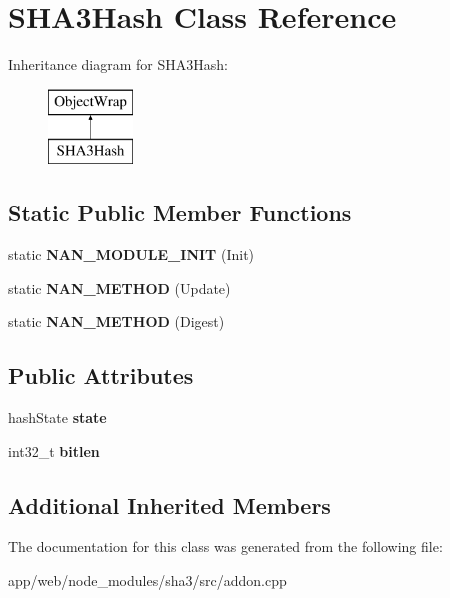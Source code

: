 \hypertarget{class_s_h_a3_hash}{}\section{S\+H\+A3\+Hash Class Reference}
\label{class_s_h_a3_hash}
Inheritance diagram for S\+H\+A3\+Hash\+:\begin{figure}[H]
\begin{center}
\leavevmode
\includegraphics[height=2.000000cm]{class_s_h_a3_hash}
\end{center}
\end{figure}
\subsection*{Static Public Member Functions}
\begin{DoxyCompactItemize}
\item 
\mbox{\label{class_s_h_a3_hash_ae3abb7e4bbf5833b3c4eb1c877d1453a}} 
static {\bfseries N\+A\+N\+\_\+\+M\+O\+D\+U\+L\+E\+\_\+\+I\+N\+IT} (Init)
\item 
\mbox{\label{class_s_h_a3_hash_a2b3dce39985e4d038b82e880e8cdc25a}} 
static {\bfseries N\+A\+N\+\_\+\+M\+E\+T\+H\+OD} (Update)
\item 
\mbox{\label{class_s_h_a3_hash_a6b4a302e049eaa989dbfe0e1a2f68033}} 
static {\bfseries N\+A\+N\+\_\+\+M\+E\+T\+H\+OD} (Digest)
\end{DoxyCompactItemize}
\subsection*{Public Attributes}
\begin{DoxyCompactItemize}
\item 
\mbox{\label{class_s_h_a3_hash_ae0b0951823d64f65fd6955b68a221e1a}} 
hash\+State {\bfseries state}
\item 
\mbox{\label{class_s_h_a3_hash_a29aba7734c7ac9e700f3ec601c1dfa5c}} 
int32\+\_\+t {\bfseries bitlen}
\end{DoxyCompactItemize}
\subsection*{Additional Inherited Members}


The documentation for this class was generated from the following file\+:\begin{DoxyCompactItemize}
\item 
app/web/node\+\_\+modules/sha3/src/addon.\+cpp\end{DoxyCompactItemize}
